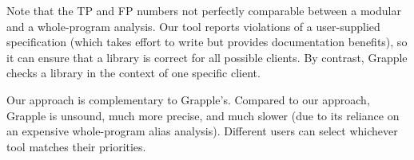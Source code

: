 Note that the TP and FP numbers not perfectly comparable between a modular
and a whole-program analysis.
Our tool reports violations of a user-supplied specification
(which takes effort to write but provides documentation benefits), so it
can ensure that a library is correct for all possible clients.  By
contrast, Grapple checks a library in the context of one specific client.

Our approach is complementary to Grapple's.
Compared to our approach, Grapple is unsound, 
much more precise,
and much slower (due to its reliance on
an expensive whole-program alias analysis).
Different users can select whichever tool matches
their priorities.


